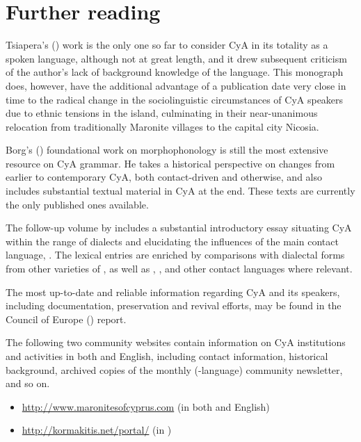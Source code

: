 \documentclass[output=paper]{langsci/langscibook}
\begin{document}
\section*{Further reading}\label{FR}
\begin{furtherreading}
\item Tsiapera's (\citeyear{Tsiapera1969}) work is the only one so far to consider CyA in its totality as a spoken language, although not at great length, and it drew subsequent criticism of the author’s lack of background knowledge of the  language. This monograph does, however, have the additional advantage of a publication date very close in time to the radical change in the sociolinguistic circumstances of CyA speakers due to ethnic tensions in the island, culminating in their near-unanimous relocation from traditionally Maronite villages to the capital city Nicosia.
\item Borg's (\citeyear{Borg1985}) foundational work on morphophonology is still the most extensive resource on CyA grammar. He takes a historical perspective on changes from earlier  to contemporary CyA, both contact-driven and otherwise, and also includes substantial textual material in CyA at the end. These texts are currently the only published ones available.
\item The follow-up volume by \citet{Borg2004} includes a substantial introductory essay situating CyA within the range of  dialects and elucidating the influences of the main contact language, . The lexical entries are enriched by comparisons with dialectal forms from other varieties of , as well as , , and other contact languages where relevant.
\item The most up-to-date and reliable information regarding CyA and its speakers, including documentation, preservation and revival efforts, may be found in the Council of Europe (\citeyear{CouncilofEurope2017}) report.
\item The following two community websites contain information on CyA institutions and activities in both  and English, including contact information, historical background, archived copies of the monthly (-language) community newsletter, and so on.

\begin{itemize}
\item \url{http://www.maronitesofcyprus.com} (in both  and English)
\item \url{http://kormakitis.net/portal/} (in )
\end{itemize}
\end{furtherreading}
\end{document}
